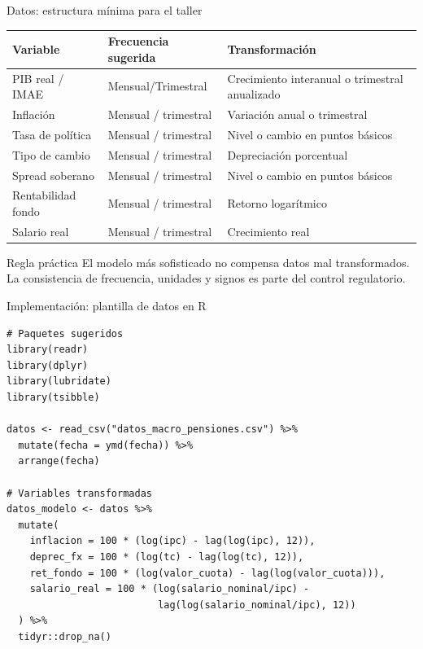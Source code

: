 \documentclass[10pt,aspectratio=169]{beamer}
\begin{document}
\begin{frame}{Datos: estructura mínima para el taller}
\begin{table}
\small
\begin{tabular}{lll}
\toprule
Variable & Frecuencia sugerida & Transformación \\
\midrule
PIB real / IMAE & Mensual/Trimestral & Crecimiento interanual o trimestral anualizado \\
Inflación & Mensual / trimestral & Variación anual o trimestral \\
Tasa de política & Mensual / trimestral & Nivel o cambio en puntos básicos \\
Tipo de cambio & Mensual / trimestral & Depreciación porcentual \\
Spread soberano & Mensual / trimestral & Nivel o cambio en puntos básicos \\
Rentabilidad fondo & Mensual / trimestral & Retorno logarítmico \\
Salario real & Mensual / trimestral & Crecimiento real \\
\bottomrule
\end{tabular}
\end{table}

\begin{block}{Regla práctica}
El modelo más sofisticado no compensa datos mal transformados. La consistencia de frecuencia, unidades y signos es parte del control regulatorio.
\end{block}
\end{frame}

\begin{frame}[fragile]{Implementación: plantilla de datos en R}
\begin{lstlisting}
# Paquetes sugeridos
library(readr)
library(dplyr)
library(lubridate)
library(tsibble)

datos <- read_csv("datos_macro_pensiones.csv") %>%
  mutate(fecha = ymd(fecha)) %>%
  arrange(fecha)

# Variables transformadas
datos_modelo <- datos %>%
  mutate(
    inflacion = 100 * (log(ipc) - lag(log(ipc), 12)),
    deprec_fx = 100 * (log(tc) - lag(log(tc), 12)),
    ret_fondo = 100 * (log(valor_cuota) - lag(log(valor_cuota))),
    salario_real = 100 * (log(salario_nominal/ipc) -
                          lag(log(salario_nominal/ipc), 12))
  ) %>%
  tidyr::drop_na()
\end{lstlisting}
\end{frame}
\end{document}
